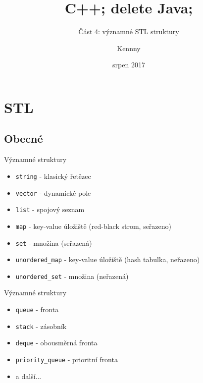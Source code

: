 \documentclass{beamer}
\begin{document}
\title{C++; delete Java;}
\subtitle{Část 4: významné STL struktury}
\author{Kennny}
\date{srpen 2017}

\frame{\titlepage}


\newenvironment{xframe}[1][]
  {\begin{frame}[fragile,environment=xframe,#1]}
  {\end{frame}}

\begin{comment}
\begin{xframe}{tttt}
	\begin{itemize}
		\item
	\end{itemize}
\end{xframe}
\end{comment}



\section{STL}
\subsection{Obecné}



\begin{xframe}{Významné struktury}
	\begin{itemize}
		\item \texttt{string} - klasický řetězec
		\item \texttt{vector} - dynamické pole
		\item \texttt{list} - spojový seznam
		\item \texttt{map} - key-value úložiště (red-black strom, seřazeno)
		\item \texttt{set} - množina (seřazená)
		\item \texttt{unordered\_map} - key-value úložiště (hash tabulka, neřazeno)
		\item \texttt{unordered\_set} - množina (neřazená)
	\end{itemize}
\end{xframe}

\begin{xframe}{Významné struktury}
	\begin{itemize}
		\item \texttt{queue} - fronta
		\item \texttt{stack} - zásobník
		\item \texttt{deque} - obousměrná fronta
		\item \texttt{priority\_queue} - prioritní fronta
		\item a další...
	\end{itemize}
\end{xframe}
\end{document}
